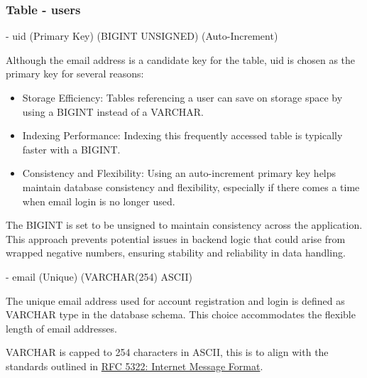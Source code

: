 \documentclass[12pt]{report}
\newcommand{\n}{\par}
\newcommand{\br}{\vspace{1 em}\n}
\begin{document}
\subsubsection{Table - users} \label{data-layer.design.user-system.users}
- uid (Primary Key) (BIGINT UNSIGNED) (Auto-Increment)\n
Although the email address is a candidate key for the table, uid is chosen as the primary key for several reasons:\n
\begin{itemize}
	\item Storage Efficiency: Tables referencing a user can save on storage space by using a BIGINT instead of a VARCHAR.
	\item Indexing Performance: Indexing this frequently accessed table is typically faster with a BIGINT.
	\item Consistency and Flexibility: Using an auto-increment primary key helps maintain database consistency and flexibility, especially if there comes a time when email login is no longer used.
\end{itemize}\n
The BIGINT is set to be unsigned to maintain consistency across the application.
This approach prevents potential issues in backend logic that could arise from wrapped negative numbers,
ensuring stability and reliability in data handling.
\br
- email (Unique) (VARCHAR(254) ASCII)\n
The unique email address used for account registration and login is defined as VARCHAR type in the database schema. This choice accommodates the flexible length of email addresses.\n
VARCHAR is capped to 254 characters in ASCII, this is to align with the standards outlined in
\href{https://www.rfc-editor.org/rfc/rfc5322}{RFC 5322: Internet Message Format}.
\br







\end{document}
